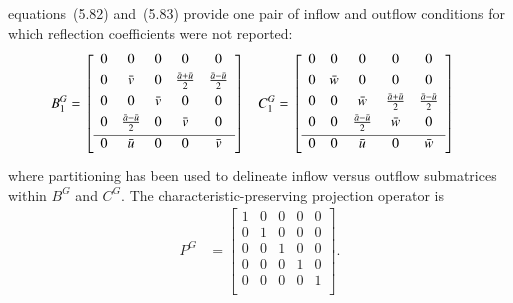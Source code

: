 \documentclass[letterpaper,11pt,nointlimits,reqno,draft]{amsart}
\begin{document}
equations~(5.82) and~(5.83) provide one pair of inflow and outflow conditions
for which reflection coefficients were not reported:
\begin{align}
\label{eq:dimeulerapproxmedidaopt1}
  B^G_1 &= \left[\begin{array}{ccccc}
    0 & 0                         & 0       & 0                           & 0                         \\ \noalign{\smallskip}
    0 & \bar{v}                   & 0       & \frac{\bar{a} + \bar{u}}{2} & \frac{\bar{a}-\bar{u}}{2} \\ \noalign{\smallskip}
    0 & 0                         & \bar{v} & 0                           & 0                         \\ \noalign{\smallskip}
    0 & \frac{\bar{a}-\bar{u}}{2} & 0       & \bar{v}                     & 0                         \\ \noalign{\smallskip} \hline
    0 & \bar{u}                   & 0       & 0                           & \bar{v}                   \\ \noalign{\smallskip}
  \end{array}\right]
&
  C^G_1 &= \left[\begin{array}{ccccc}
    0 & 0       & 0                         & 0                         & 0                         \\ \noalign{\smallskip}
    0 & \bar{w} & 0                         & 0                         & 0                         \\ \noalign{\smallskip}
    0 & 0       & \bar{w}                   & \frac{\bar{a}+\bar{u}}{2} & \frac{\bar{a}-\bar{u}}{2} \\ \noalign{\smallskip}
    0 & 0       & \frac{\bar{a}-\bar{u}}{2} & \bar{w}                   & 0                         \\ \noalign{\smallskip} \hline
    0 & 0       & \bar{u}                   & 0                         & \bar{w}                   \\ \noalign{\smallskip}
  \end{array}\right]
\end{align}
where partitioning has been used to delineate inflow versus outflow submatrices
within $B^G$ and $C^G$.  The characteristic-preserving projection operator is
\begin{align}
\label{eq:PGmedida}
  P^G
  &= \left[\begin{array}{ccccc}
    1 & 0 & 0 & 0 & 0 \\
    0 & 1 & 0 & 0 & 0 \\
    0 & 0 & 1 & 0 & 0 \\
    0 & 0 & 0 & 1 & 0 \\ \hline
    0 & 0 & 0 & 0 & 1 \\
  \end{array}\right]
.
\end{align}
\end{document}
